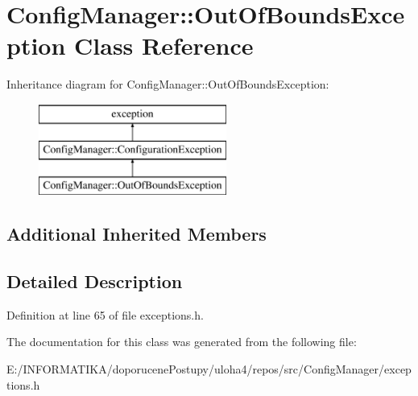 \hypertarget{class_config_manager_1_1_out_of_bounds_exception}{}\section{Config\+Manager\+:\+:Out\+Of\+Bounds\+Exception Class Reference}
\label{class_config_manager_1_1_out_of_bounds_exception}
Inheritance diagram for Config\+Manager\+:\+:Out\+Of\+Bounds\+Exception\+:\begin{figure}[H]
\begin{center}
\leavevmode
\includegraphics[height=3.000000cm]{class_config_manager_1_1_out_of_bounds_exception}
\end{center}
\end{figure}
\subsection*{Additional Inherited Members}


\subsection{Detailed Description}


Definition at line 65 of file exceptions.\+h.



The documentation for this class was generated from the following file\+:\begin{DoxyCompactItemize}
\item 
E\+:/\+I\+N\+F\+O\+R\+M\+A\+T\+I\+K\+A/doporucene\+Postupy/uloha4/repos/src/\+Config\+Manager/exceptions.\+h\end{DoxyCompactItemize}

